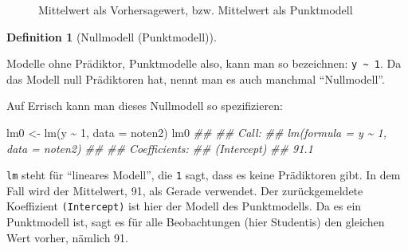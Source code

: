 \documentclass[
  letterpaper,
  oneside,
  open=any]{scrbook}
\newenvironment{Shaded}{\begin{snugshade}}{\end{snugshade}}
\newcommand{\AttributeTok}[1]{\textcolor[rgb]{0.40,0.45,0.13}{#1}}
\newcommand{\DecValTok}[1]{\textcolor[rgb]{0.68,0.00,0.00}{#1}}
\newcommand{\DocumentationTok}[1]{\textcolor[rgb]{0.37,0.37,0.37}{\textit{#1}}}
\newcommand{\FunctionTok}[1]{\textcolor[rgb]{0.28,0.35,0.67}{#1}}
\newcommand{\NormalTok}[1]{\textcolor[rgb]{0.00,0.23,0.31}{#1}}
\newcommand{\OtherTok}[1]{\textcolor[rgb]{0.00,0.23,0.31}{#1}}
\newcommand{\SpecialCharTok}[1]{\textcolor[rgb]{0.37,0.37,0.37}{#1}}
\theoremstyle{definition}
\theoremstyle{definition}
\theoremstyle{definition}
\newtheorem{definition}{Definition}[chapter]
\theoremstyle{remark}
\begin{document}
\begin{figure}


\caption{\label{fig-noten3}Mittelwert als Vorhersagewert, bzw.
Mittelwert als Punktmodell}

\end{figure}%

\begin{definition}[Nullmodell
(Punktmodell)]\protect\hypertarget{def-nullmodell}{}\label{def-nullmodell}

Modelle ohne Prädiktor, Punktmodelle also, kann man so bezeichnen:
\texttt{y\ \textasciitilde{}\ 1}. Da das Modell null Prädiktoren hat,
nennt man es auch manchmal \enquote{Nullmodell}.

\end{definition}

Auf Errisch kann man dieses Nullmodell so spezifizieren:

\begin{Shaded}
\begin{Highlighting}[]
\NormalTok{lm0 }\OtherTok{\textless{}{-}} \FunctionTok{lm}\NormalTok{(y }\SpecialCharTok{\textasciitilde{}} \DecValTok{1}\NormalTok{, }\AttributeTok{data =}\NormalTok{ noten2)}
\NormalTok{lm0}
\DocumentationTok{\#\# }
\DocumentationTok{\#\# Call:}
\DocumentationTok{\#\# lm(formula = y \textasciitilde{} 1, data = noten2)}
\DocumentationTok{\#\# }
\DocumentationTok{\#\# Coefficients:}
\DocumentationTok{\#\# (Intercept)  }
\DocumentationTok{\#\#        91.1}
\end{Highlighting}
\end{Shaded}

\texttt{lm} steht für \enquote{lineares Modell}, die \texttt{1} sagt,
dass es keine Prädiktoren gibt. In dem Fall wird der Mittelwert, 91, als
Gerade verwendet. Der zurückgemeldete Koeffizient \texttt{(Intercept)}
ist hier der Modell des Punktmodells. Da es ein Punktmodell ist, sagt es
für alle Beobachtungen (hier Studentis) den gleichen Wert vorher,
nämlich 91.
\end{document}
